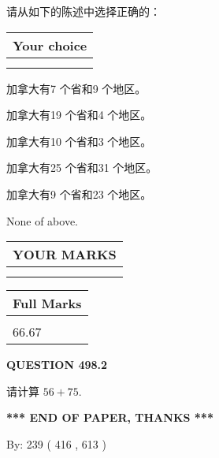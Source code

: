 \documentclass{ctexart}
\begin{document}
  
请从如下的陈述中选择正确的：
  
  
\noindent\hspace{3.0in} \begin{tabular}{|l|}
\hline
Your choice \\
\hline
 \\ 
 \\ 
\hline
\end{tabular}
  
  
 
 
加拿大有7 个省和9 个地区。
 
 
加拿大有19 个省和4 个地区。
 
 
加拿大有10 个省和3 个地区。
 
 
加拿大有25 个省和31 个地区。
 
 
加拿大有9 个省和23 个地区。
 
 
 None of above.
 
 
  
\vspace{0.2in}
  
\noindent\begin{tabular}{|l|}
\hline
 YOUR MARKS  \\
\hline
 \\ 
 \\ 
\hline
\end{tabular}
\hspace{0.05in} \begin{tabular}{|l|}
\hline
 Full Marks  \\
\hline
 \\ 
66.67 \\
\hline
\end{tabular}
{\textbf{\Large{QUESTION
498.2 
}}}
  
  
 
请计算 $ %
56 +  %
75 $.
 

 

 
   
   
 \vspace{0.2in}
 
   
   
   
   
\vspace{1.0in} 
{\textbf{\large{ *** END OF PAPER, THANKS *** }}} 
   
   
\hspace{1.0in} By: 
 239 ( 416 ,  613 )
   
\end{document}
